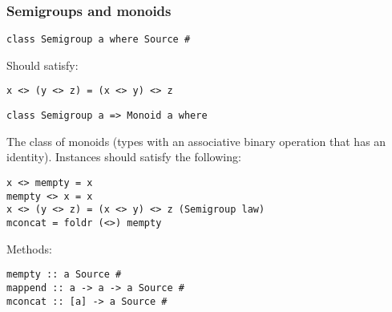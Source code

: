 %

\subsubsection{Semigroups and monoids}

\begin{verbatim}
class Semigroup a where Source #
\end{verbatim}
Should satisfy:
\begin{verbatim}
x <> (y <> z) = (x <> y) <> z
\end{verbatim}

\begin{verbatim}
class Semigroup a => Monoid a where
\end{verbatim}

The class of monoids (types with an associative binary operation that has an identity). Instances should satisfy the following:

\begin{verbatim}
x <> mempty = x
mempty <> x = x
x <> (y <> z) = (x <> y) <> z (Semigroup law)
mconcat = foldr (<>) mempty
\end{verbatim}

Methods:
\begin{verbatim}
mempty :: a Source #
mappend :: a -> a -> a Source #
mconcat :: [a] -> a Source #
\end{verbatim}

%